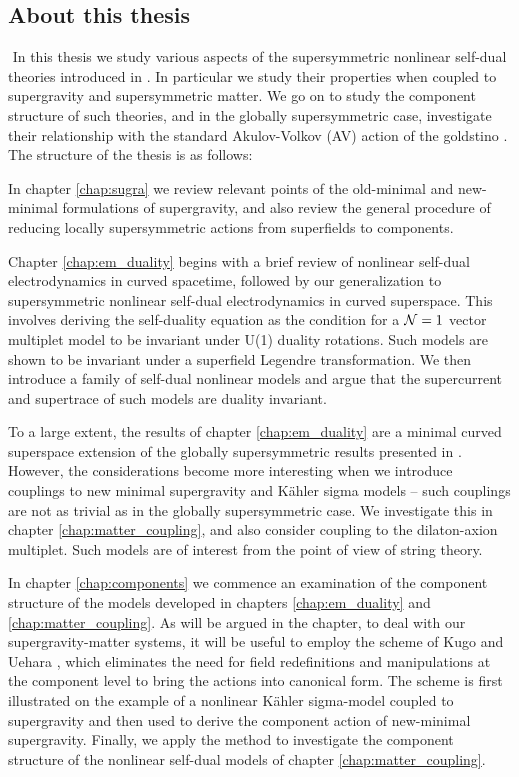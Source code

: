 \vskip0.5cm
\subsection*{About this thesis}
${}$\newline
\indent In this thesis we study various aspects of the supersymmetric nonlinear self-dual theories introduced in \cite{Kuzenko:2000tg,Kuzenko:2000uh}. In particular we study their properties when coupled to supergravity and supersymmetric matter. We go on to study the component structure of such theories, and in the globally supersymmetric case, investigate their relationship with the standard Akulov-Volkov (AV) action of the goldstino \cite{Volkov:1972jx,Volkov:1973ix}. The structure of the thesis is as follows:

In chapter \ref{chap:sugra} we review relevant points of the old-minimal \cite{Wess:1977fn, Grimm:1977kp, Wess:1978bu, Stelle:1978ye,Ferrara:1978em} and new-minimal \cite{Akulov:1977bu,Sohnius:1981tp} formulations of supergravity, and also review the general procedure of reducing locally supersymmetric actions from superfields to components.

Chapter \ref{chap:em_duality} begins with a brief review of nonlinear self-dual electrodynamics in curved spacetime, followed by our generalization to supersymmetric nonlinear self-dual electrodynamics in curved superspace. This involves deriving the self-duality equation as the condition for a ${\cal N}=1$ vector multiplet model to be invariant under U(1) duality rotations. Such models are shown to be invariant under a superfield Legendre transformation. We then introduce a family of self-dual nonlinear models and argue that the supercurrent and supertrace of such models are duality invariant. 

To a large extent, the results of chapter \ref{chap:em_duality} are a minimal curved superspace extension of the globally supersymmetric results presented in \cite{Kuzenko:2000uh}. However, the considerations become more interesting when we introduce couplings to new minimal supergravity and K{\"a}hler sigma models -- such couplings are not as trivial as in the globally supersymmetric case. We investigate this in chapter \ref{chap:matter_coupling}, and also consider coupling to the dilaton-axion multiplet. Such models are of interest from the point of view of string theory.

In chapter \ref{chap:components} we commence an examination of the component structure of the models developed in chapters \ref{chap:em_duality} and \ref{chap:matter_coupling}. As will be argued in the chapter, to deal with our supergravity-matter systems, it will be useful to employ the scheme of Kugo and Uehara \cite{Kugo:1982mr}, which eliminates the need for field redefinitions and manipulations at the component level to bring the actions into canonical form. The scheme is first illustrated on the example of a nonlinear K{\"a}hler sigma-model coupled to supergravity and then used to derive the component action of new-minimal supergravity. Finally, we apply the method to investigate the component structure of the nonlinear self-dual models of chapter \ref{chap:matter_coupling}.


